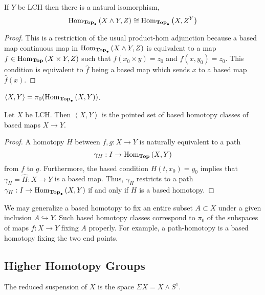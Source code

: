 \documentclass[12pt]{extarticle}
\begin{document}
\begin{theorem}
If $Y$ be LCH then there is a natural isomorphism,
\[\mathrm{Hom}_{\mathbf{Top}_{\bullet}}\left( X \wedge Y, Z \right) \cong \mathrm{Hom}_{\mathbf{Top}_{\bullet}}\left( X, Z^Y \right) \]
\end{theorem}

\begin{proof}
This is a restriction of the usual product-hom adjunction because a based map continuous map in $\mathrm{Hom}_{\mathbf{Top}_{\bullet}}\left( X \wedge Y, Z \right)$ is equivalent to a map $f \in \mathrm{Hom}_{\mathbf{Top}}\left( X \times Y, Z \right)$ such that $f(x_0 \times y) = z_0$ and $f(x, y_0) = z_0$. This condition is equivalent to $\hat{f}$ being a based map which sends $x$ to a based map $\hat{f}(x)$.  
\end{proof}

\begin{definition}
$\left< X, Y \right> = \pi_0(\mathrm{Hom}_{\mathbf{Top}_{\bullet}}\left( X, Y \right))$.
\end{definition}

\begin{proposition}
Let $X$ be LCH. Then $\left< X, Y \right>$ is the pointed set of based homotopy classes of based maps $X \to Y$.  
\end{proposition}

\begin{proof}
A homotopy $H$ between $f, g : X \to Y$ is naturally equivalent to a path 
\[\gamma_H : I \to \mathrm{Hom}_{\mathbf{Top}}\left( X, Y \right)\]
from $f$ to $g$. Furthermore, the based condition $H(t, x_0) = y_0$ implies that $\gamma_H = \hat{H} : X \to Y$ is a based map. Thus, $\gamma_H$ restricts to a path $\gamma_H : I \to \mathrm{Hom}_{\mathbf{Top}_{\bullet}}\left( X, Y \right)$ if and only if $H$ is a based homotopy.    
\end{proof}

\begin{remark}
We may generalize a based homotopy to fix an entire subset $A \subset X$ under a given inclusion $A \hookrightarrow Y$. Such based homotopy classes correspond to $\pi_0$ of the subspaces of maps $f : X \to Y$ fixing $A$ properly. For example, a path-homotopy is a based homotopy fixing the two end points. 
\end{remark}

\subsection{Higher Homotopy Groups}


\begin{definition}
The reduced suspension of $X$ is the space $\Sigma X = X \wedge S^1$. 
\end{definition}
\end{document}
